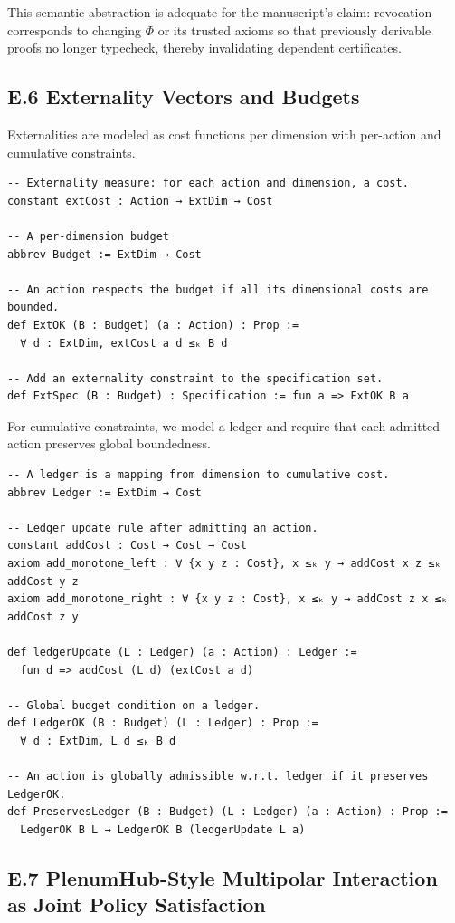 \documentclass[11pt,oneside]{article}
\begin{document}
This semantic abstraction is adequate for the manuscript’s claim: revocation corresponds to changing \( \Phi \) or its trusted axioms so that previously derivable proofs no longer typecheck, thereby invalidating dependent certificates.

\subsection{E.6 Externality Vectors and Budgets}

Externalities are modeled as cost functions per dimension with per-action and cumulative constraints.

\begin{verbatim}
-- Externality measure: for each action and dimension, a cost.
constant extCost : Action → ExtDim → Cost

-- A per-dimension budget
abbrev Budget := ExtDim → Cost

-- An action respects the budget if all its dimensional costs are bounded.
def ExtOK (B : Budget) (a : Action) : Prop :=
  ∀ d : ExtDim, extCost a d ≤ₖ B d

-- Add an externality constraint to the specification set.
def ExtSpec (B : Budget) : Specification := fun a => ExtOK B a
\end{verbatim}

For cumulative constraints, we model a ledger and require that each admitted action preserves global boundedness.

\begin{verbatim}
-- A ledger is a mapping from dimension to cumulative cost.
abbrev Ledger := ExtDim → Cost

-- Ledger update rule after admitting an action.
constant addCost : Cost → Cost → Cost
axiom add_monotone_left : ∀ {x y z : Cost}, x ≤ₖ y → addCost x z ≤ₖ addCost y z
axiom add_monotone_right : ∀ {x y z : Cost}, x ≤ₖ y → addCost z x ≤ₖ addCost z y

def ledgerUpdate (L : Ledger) (a : Action) : Ledger :=
  fun d => addCost (L d) (extCost a d)

-- Global budget condition on a ledger.
def LedgerOK (B : Budget) (L : Ledger) : Prop :=
  ∀ d : ExtDim, L d ≤ₖ B d

-- An action is globally admissible w.r.t. ledger if it preserves LedgerOK.
def PreservesLedger (B : Budget) (L : Ledger) (a : Action) : Prop :=
  LedgerOK B L → LedgerOK B (ledgerUpdate L a)
\end{verbatim}

\subsection{E.7 PlenumHub-Style Multipolar Interaction as Joint Policy Satisfaction}
\end{document}
